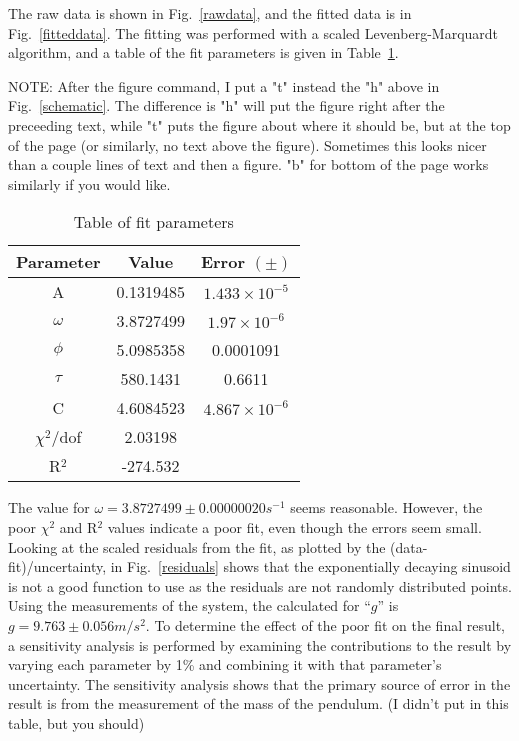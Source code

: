 \documentclass[prb,preprint,groupaddress,showpacs,superbib,floats]{revtex4-1}
\begin{document}
The raw data is shown in Fig.~\ref{rawdata}, and the fitted data is in Fig.~\ref{fitteddata}.  The fitting was performed with a scaled Levenberg-Marquardt algorithm, and a table of the fit parameters is given in Table~\ref{fitvalues}.

NOTE:  After the figure command, I put a "t" instead the "h" above in Fig.~\ref{schematic}.  The difference is "h" will put the figure right after the preceeding text, while "t" puts the figure about where it should be, but at the top of the page (or similarly, no text above the figure).  Sometimes this looks nicer than a couple lines of text and then a figure. "b" for bottom of the page works similarly if you would like.


%

\begin{table}[t]
	\begin{ruledtabular}
		\begin{tabular}{ccc}
			
			\textbf{Parameter} & \textbf{Value} & \textbf{Error $(\pm)$} \\ 
			\hline
			A & 0.1319485  & $1.433 \times 10^{-5}$ \\ 
			$\omega$ & 3.8727499 & $1.97 \times 10^{-6}$ \\ 
			$\phi$ & 5.0985358 & 0.0001091 \\ 
			$\tau$ & 580.1431  & 0.6611 \\ 
			C & 4.6084523 & $4.867 \times 10^{-6}$  \\ 
			$\chi^2$/dof & 2.03198 & \\ 
			R$^2$ & -274.532 &  \\ 
			
		\end{tabular}
	\end{ruledtabular}
	\caption{Table of fit parameters}
	\label{fitvalues}
\end{table}


The value for $\omega = 3.8727499 \pm 0.00000020 s^{-1}$ seems reasonable.  However, the poor $\chi^2$ and R$^2$ values indicate a poor fit, even though the errors seem small.  Looking at the scaled residuals from the fit, as plotted by the (data-fit)/uncertainty, in Fig.~\ref{residuals} shows that the exponentially decaying sinusoid is not a good function to use as the residuals are not randomly distributed points. Using the measurements of the system, the calculated for “$g$” is $g = 9.763 \pm 0.056 m/s^2$.  To determine the effect of the poor fit on the final result, a sensitivity analysis is performed by examining the contributions to the result by varying each parameter by 1\% and combining it with that parameter's uncertainty. The sensitivity analysis shows that the primary source of error in the result is from the measurement of the mass of the pendulum. (I didn't put in this table, but you should)
\end{document}
